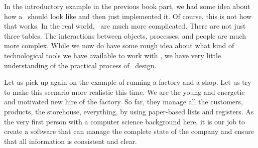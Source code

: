 %
%
In the introductory example in the previous book part, we had some idea about how a \db\ should look like and then just implemented it.
Of course, this is not how that works.
In the real world, \dbs\ are much more complicated.
There are not just three tables.
The interactions between objects, processes, and people are much more complex.
While we now do have some rough idea about what kind of technological tools we have available to work with \dbs, we have very little understanding of the practical process of \db\ design.

Let us pick up again on the example of running a factory and a shop.
Let us try to make this scenario more realistic this time.
We are the young and energetic and motivated new hire of the factory.
So far, they manage all the customers, products, the storehouse, everything, by using paper-based lists and registers.
As the very first person with a computer science background here, it is our job to create a software that can manage the complete state of the company and ensure that all information is consistent and clear.%
%
%
%
\endhsection%
%
